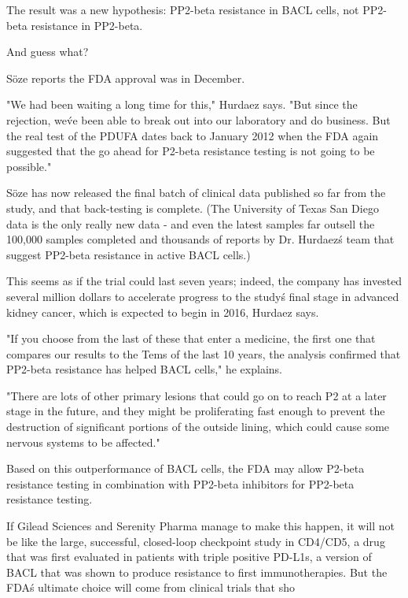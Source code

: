 \documentclass{article}
\begin{document}
The result was a new hypothesis: PP2-beta resistance in BACL cells, not PP2-beta resistance in PP2-beta.

And guess what?

Söze reports the FDA approval was in December.

"We had been waiting a long time for this," Hurdaez says. "But since the rejection, we\'ve been able to break out into our laboratory and do business. But the real test of the PDUFA dates back to January 2012 when the FDA again suggested that the go ahead for P2-beta resistance testing is not going to be possible."

Söze has now released the final batch of clinical data published so far from the study, and that back-testing is complete. (The University of Texas San Diego data is the only really new data - and even the latest samples far outsell the 100,000 samples completed and thousands of reports by Dr. Hurdaez\'s team that suggest PP2-beta resistance in active BACL cells.)

This seems as if the trial could last seven years; indeed, the company has invested several million dollars to accelerate progress to the study\'s final stage in advanced kidney cancer, which is expected to begin in 2016, Hurdaez says.

"If you choose from the last of these that enter a medicine, the first one that compares our results to the Tems of the last 10 years, the analysis confirmed that PP2-beta resistance has helped BACL cells," he explains.

"There are lots of other primary lesions that could go on to reach P2 at a later stage in the future, and they might be proliferating fast enough to prevent the destruction of significant portions of the outside lining, which could cause some nervous systems to be affected."

Based on this outperformance of BACL cells, the FDA may allow P2-beta resistance testing in combination with PP2-beta inhibitors for PP2-beta resistance testing.

If Gilead Sciences and Serenity Pharma manage to make this happen, it will not be like the large, successful, closed-loop checkpoint study in CD4/CD5, a drug that was first evaluated in patients with triple positive PD-L1s, a version of BACL that was shown to produce resistance to first immunotherapies. But the FDA\'s ultimate choice will come from clinical trials that sho
\end{document}
